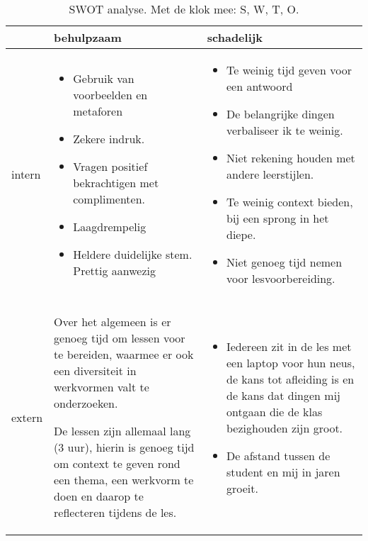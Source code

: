 \begin{table}[h]
  \begin{center}
  \hspace*{-2cm}
  \begin{tabular}{ l | p{6cm} | p{6cm} }
     \hline
      & behulpzaam & schadelijk \\ \hline
     intern & 
       \begin{itemize}[noitemsep, leftmargin=*]
         \item{Gebruik van voorbeelden en metaforen} 
         \item{Zekere indruk.}
         \item{Vragen positief bekrachtigen met complimenten.}
         \item{Laagdrempelig}
         \item{Heldere duidelijke stem. Prettig aanwezig}
       \end{itemize}
     & 
       \begin{itemize}[noitemsep, leftmargin=*]
         \item{Te weinig tijd geven voor een antwoord}
         \item{De belangrijke dingen verbaliseer ik te weinig.}
         \item{Niet rekening houden met andere leerstijlen.}
         \item{Te weinig context bieden, bij een sprong in het diepe.}
         \item{Niet genoeg tijd nemen voor lesvoorbereiding.}
       \end{itemize}
         \\ \hline
     extern & 
       \begin{itemize}[noitemsep, leftmargin=*]
         \item{Over het algemeen is er genoeg tijd om lessen voor te bereiden, waarmee er ook een diversiteit in werkvormen valt te onderzoeken.
         \item De lessen zijn allemaal lang (3 uur), hierin is genoeg tijd om context te geven rond een thema, een werkvorm te doen en daarop te reflecteren tijdens de les.}
       \end{itemize}
       & 
       \begin{itemize}[noitemsep, leftmargin=*]
         \item{Iedereen zit in de les met een laptop voor hun neus, de kans tot afleiding is en de kans dat dingen mij ontgaan die de klas bezighouden zijn groot.}
         \item{De afstand tussen de student en mij in jaren groeit.}
       \end{itemize}
       \\
     \hline
   \end{tabular}
   \caption{SWOT analyse. Met de klok mee: S, W, T, O.}
   \label{tab:SWOTDidactiek}
  \end{center}
 \end{table}

